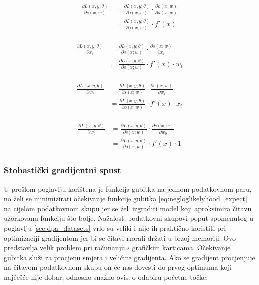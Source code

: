 \documentclass[times, utf8, numeric, diplomski]{fer}
\def\pfrac#1#2{\frac{\partial #1}{\partial #2}}
\begin{document}
\newpage

\begin{align}
\label{eq:backprop_activation}
\begin{split}
\pfrac{L(x,y;\theta)}{s(x;w)} &= \pfrac{L(x,y;\theta)}{o(x;w)} \cdot \pfrac{o(x;w)}{s(x;w)} \\
&= \pfrac{L(x,y;\theta)}{o(x;w)} \cdot f'(x)
\end{split}
\end{align}

\begin{align}
\begin{split}
\pfrac{L(x,y;\theta)}{x_i} &= \pfrac{L(x,y;\theta)}{s(x;w)} \cdot \pfrac{s(x;w)}{x_i} \\
&= \pfrac{L(x,y;\theta)}{o(x;w)} \cdot f'(x) \cdot w_i
\end{split}
\end{align}

\begin{align} \label{eq:w_update}
\begin{split}
\pfrac{L(x,y;\theta)}{w_i} &= \pfrac{L(x,y;\theta)}{s(x;w)} \cdot \pfrac{s(x;w)}{w_i} \\
&= \pfrac{L(x,y;\theta)}{o(x;w)} \cdot f'(x) \cdot x_i
\end{split}
\end{align}

\begin{align}
\begin{split}
\pfrac{L(x,y;\theta)}{w_0} &= \pfrac{L(x,y;\theta)}{s(x;w)} \cdot \pfrac{s(x;w)}{w_0} \\
&= \pfrac{L(x,y;\theta)}{o(x;w)} \cdot f'(x) \cdot 1
\end{split}
\end{align}

\subsubsection{Stohastički gradijentni spust}
U prošlom poglavlju korištena je funkcija gubitka na jednom podatkovnom paru, no želi se minimizirati očekivanje funkcije gubitka \eqref{eq:negloglikelyhood_expect} na cijelom podatkovnom skupu jer se želi izgraditi model koji aproksimira čitavu uzorkovanu funkciju što bolje. Nažalost, podatkovni skupovi poput spomenutog u poglavlju \ref{sec:dpa_datasets} vrlo su veliki i nije ih praktično koristiti pri optimizaciji gradijentom jer bi se čitavi morali držati u brzoj memoriji. Ovo predstavlja velik problem pri računanju s grafičkim karticama. Očekivanje gubitka služi za procjenu smjera i veličine gradijenta. Ako se gradijent procjenjuje na čitavom podatkovnom skupu on će nas dovesti do prvog optimuma koji najčešće nije dobar, odnosno snažno ovisi o odabiru početne točke. 
\end{document}
